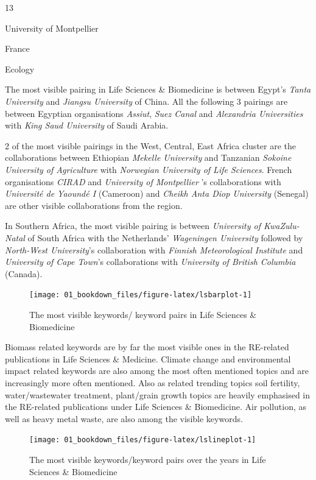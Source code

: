 \documentclass[
]{book}
\begin{document}
{13}

{University of Montpellier }

{France }

{Ecology }

The most visible pairing in Life Sciences \& Biomedicine is between Egypt's \emph{Tanta University} and \emph{Jiangsu University} of China. All the following 3 pairings are between Egyptian organisations \emph{Assiut}, \emph{Suez Canal} and \emph{Alexandria Universities} with \emph{King Saud University} of Saudi Arabia.

2 of the most visible pairings in the West, Central, East Africa cluster are the collaborations between Ethiopian \emph{Mekelle University} and Tanzanian \emph{Sokoine University of Agriculture} with \emph{Norwegian University of Life Sciences}. French organisations \emph{CIRAD} and \emph{University of Montpellier }'s collaborations with \emph{Université de Yaoundé I} (Cameroon) and \emph{Cheikh Anta Diop University} (Senegal) are other visible collaborations from the region.

In Southern Africa, the most visible pairing is between \emph{University of KwaZulu-Natal} of South Africa with the Netherlands' \emph{Wageningen University} followed by \emph{North-West University}'s collaboration with \emph{Finnish Meteorological Institute} and \emph{University of Cape Town}'s collaborations with \emph{University of British Columbia} (Canada).

\begin{figure}
\texttt{[image: 01\_bookdown\_files/figure-latex/lsbarplot-1]} \caption{The most visible keywords/ keyword pairs in Life Sciences & Biomedicine}\label{fig:lsbarplot}
\end{figure}

Biomass related keywords are by far the most visible ones in the RE-related publications in Life Sciences \& Medicine. Climate change and environmental impact related keywords are also among the most often mentioned topics and are increasingly more often mentioned. Also as related trending topics soil fertility, water/wastewater treatment, plant/grain growth topics are heavily emphasised in the RE-related publications under Life Sciences \& Biomedicine. Air pollution, as well as heavy metal waste, are also among the visible keywords.

\begin{figure}
\texttt{[image: 01\_bookdown\_files/figure-latex/lslineplot-1]} \caption{The most visible keywords/keyword pairs over the years in Life Sciences & Biomedicine}\label{fig:lslineplot}
\end{figure}
\end{document}
